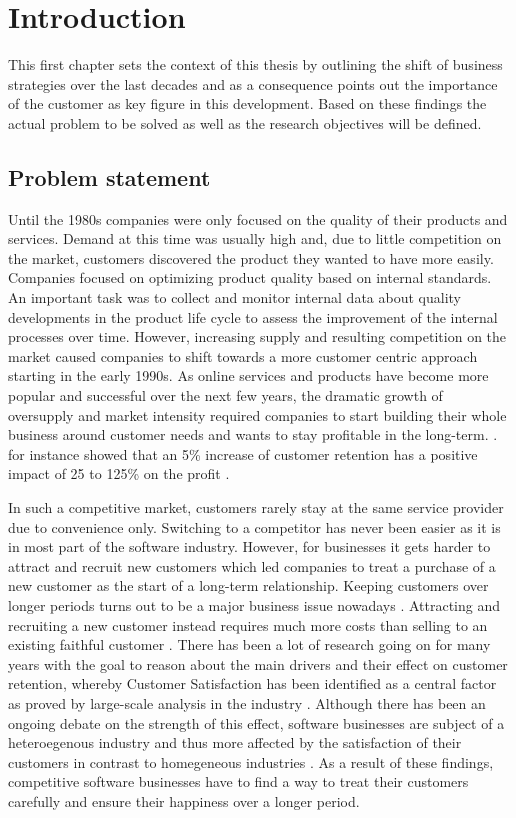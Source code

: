 \chapter{Introduction}
\label{ch:intro}
This first chapter sets the context of this thesis by outlining the shift of business strategies over the last decades and as a consequence points out the importance of the customer as key figure in this development. Based on these findings the actual problem to be solved as well as the research objectives will be defined. 

\section{Problem statement}
Until the 1980s companies were only focused on the quality of their products and services. Demand at this time was usually high and, due to little competition on the market, customers discovered the product they wanted to have more easily. Companies focused on optimizing product quality based on internal standards. An important task was to collect and monitor internal data about quality developments in the product life cycle to assess the improvement of the internal processes over time. However, increasing supply and resulting competition on the market caused companies to shift towards a more customer centric approach starting in the early 1990s. As online services and products have become more popular and successful over the next few years, the dramatic growth of oversupply and market intensity required companies to start building their whole business around customer needs and wants to stay profitable in the long-term. \cite{neckel2015}. \cite{bowen2001relationship} for instance showed that an 5\% increase of customer retention has a positive impact of 25 to 125\% on the profit .

In such a competitive market, customers rarely stay at the same service provider due to convenience only. Switching to a competitor has never been easier \cite{rygielski2002data} as it is in most part of the software industry. However, for businesses it gets harder to attract and recruit new customers which led companies to treat a purchase of a new customer as the start of a long-term relationship. Keeping customers over longer periods turns out to be a major business issue nowadays \cite{nerdinger2015} \cite{neckel2015}. Attracting and recruiting a new customer instead requires much more costs than selling to an existing faithful customer \cite{aydin2006switching}. There has been a lot of research going on for many years with the goal to reason about the main drivers and their effect on customer retention, whereby Customer Satisfaction has been identified as a central factor as proved by large-scale analysis in the industry \cite{fornell1992national} \cite{bolton1998dynamic} \cite{gustafsson2005effects}. Although there has been an ongoing debate on the strength of this effect, software businesses are subject of a heteroegenous industry and thus more affected by the satisfaction of their customers in contrast to homegeneous industries \cite{fornell1992national}. As a result of these findings, competitive software businesses have to find a way to treat their customers carefully and ensure their happiness over a longer period. 

